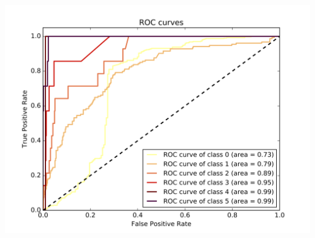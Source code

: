 \documentclass[c]{beamer}
\begin{document}
\begin{frame}
\begin{columns}
\begin{column}{0.6\textwidth}
      \centering\vfill
      \includegraphics[scale=0.18]{../../data/Belgique/test/Support_Vector_Gaussian_Classification/Support_Vector_Gaussian_Classification_roc.png}
\end{column}
\end{columns}
\end{frame}
\end{document}

